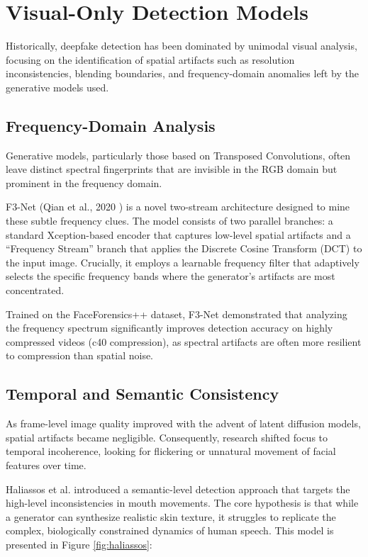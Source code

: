 \documentclass[12pt,a4paper]{report}
\begin{document}
\section{Visual-Only Detection Models}
Historically, deepfake detection has been dominated by unimodal visual analysis, focusing on the identification of spatial artifacts such as resolution inconsistencies, blending boundaries, and frequency-domain anomalies left by the generative models used.



\subsection{Frequency-Domain Analysis}
Generative models, particularly those based on Transposed Convolutions, often leave distinct spectral fingerprints that are invisible in the RGB domain but prominent in the frequency domain.

F3-Net (Qian et al., 2020 \cite{qian2020thinkingfrequencyfaceforgery}) is a novel two-stream architecture designed to mine these subtle frequency clues. The model consists of two parallel branches: a standard Xception-based encoder that captures low-level spatial artifacts and a ``Frequency Stream'' branch that applies the Discrete Cosine Transform (DCT) to the input image. Crucially, it employs a learnable frequency filter that adaptively selects the specific frequency bands where the generator's artifacts are most concentrated.


Trained on the FaceForensics++ dataset, F3-Net demonstrated that analyzing the frequency spectrum significantly improves detection accuracy on highly compressed videos (c40 compression), as spectral artifacts are often more resilient to compression than spatial noise.

\subsection{Temporal and Semantic Consistency}
As frame-level image quality improved with the advent of latent diffusion models, spatial artifacts became negligible. Consequently, research shifted focus to temporal incoherence, looking for flickering or unnatural movement of facial features over time.

Haliassos et al. \cite{haliassos2021lips} introduced a semantic-level detection approach that targets the high-level inconsistencies in mouth movements. The core hypothesis is that while a generator can synthesize realistic skin texture, it struggles to replicate the complex, biologically constrained dynamics of human speech. This model is presented in Figure \ref{fig:haliassos}:
\end{document}
